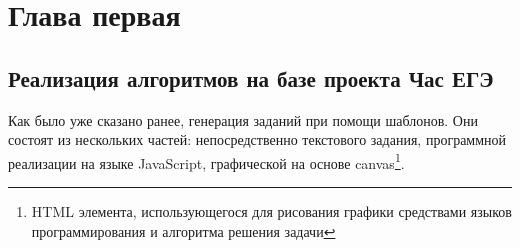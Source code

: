 
\section{Глава первая}
\subsection{Реализация алгоритмов на базе проекта Час ЕГЭ}
Как было уже сказано ранее, генерация заданий при помощи шаблонов.
Они состоят из нескольких частей: непосредственно текстового задания, программной реализации на языке JavaScript,
графической на основе canvas\footnote{HTML элемента, использующегося для рисования графики средствами языков программирования и алгоритма решения задачи}.

